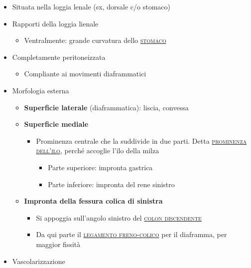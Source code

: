 \documentclass[italian,]{article}
\providecommand{\tightlist}{%
  \setlength{\itemsep}{0pt}\setlength{\parskip}{0pt}}
\renewcommand{\a}[1]{\underline{\textsc{#1}}}
\begin{document}
\begin{itemize}
\tightlist
\item
  Situata nella loggia lenale (sx, dorsale c/o stomaco)
\item
  Rapporti della loggia lienale

  \begin{itemize}
  \tightlist
  \item
    Ventralmente: grande curvatura dello \a{stomaco}
  \end{itemize}
\item
  Completamente peritoneizzata

  \begin{itemize}
  \tightlist
  \item
    Compliante ai movimenti diaframmatici
  \end{itemize}
\item
  Morfologia esterna

  \begin{itemize}
  \tightlist
  \item
    \textbf{Superficie laterale} (diaframmatica): liscia, convessa
  \item
    \textbf{Superficie mediale}

    \begin{itemize}
    \tightlist
    \item
      Prominenza centrale che la suddivide in due parti. Detta
      \a{prominenza dell'ilo}, perché accoglie l'ilo della milza

      \begin{itemize}
      \tightlist
      \item
        Parte superiore: impronta gastrica
      \item
        Parte inferiore: impronta del rene sinistro
      \end{itemize}
    \end{itemize}
  \item
    \textbf{Impronta della fessura colica di sinistra}

    \begin{itemize}
    \tightlist
    \item
      Si appoggia sull'angolo sinistro del \a{colon discendente}
    \item
      Da qui parte il \a{legamento freno-colico} per il diaframma, per
      maggior fissità
    \end{itemize}
  \end{itemize}
\item
  Vascolarizzazione


\end{itemize}
\end{document}
